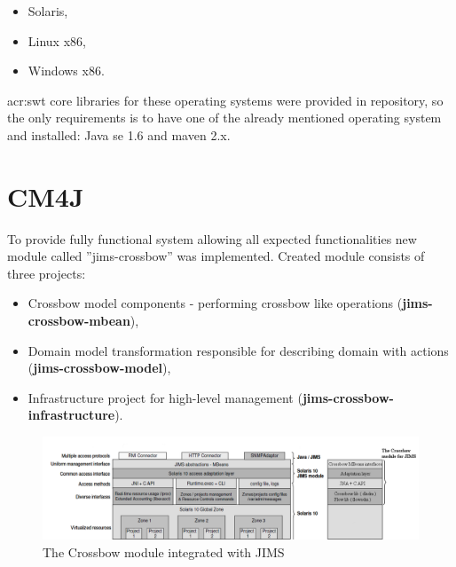 \documentclass[11pt,openany]{book}
\begin{document}
      \begin{itemize}
        \item Solaris,
        \item Linux x86,
        \item Windows x86.
      \end{itemize}

      \gls{acr:swt} core libraries for these operating systems were provided in repository, so the only requirements is to have
      one of the already mentioned operating system and installed: Java se 1.6 and maven 2.x.
	  
	  \medskip
	  

	  \section{CM4J}
		\label{sec:impl:module}

		
      To provide fully functional system allowing all expected functionalities new module called ''jims-crossbow'' was
      implemented. Created module consists of three projects:

      \begin{itemize}
        \item Crossbow model components - performing crossbow like operations (\textbf{jims-crossbow-mbean}),
        \item Domain model transformation responsible for describing domain with actions (\textbf{jims-crossbow-model}),
        \item Infrastructure project for high-level management (\textbf{jims-crossbow-infrastructure}).
      \end{itemize}

      \begin{figure}[H]
        \centering
        \includegraphics[width=1.26\textwidth, angle=90]{img/impl/jims_and_cm4j.png}

        \caption{The Crossbow module integrated with JIMS \cite{jims}}
      \end{figure}
		
\end{document}
